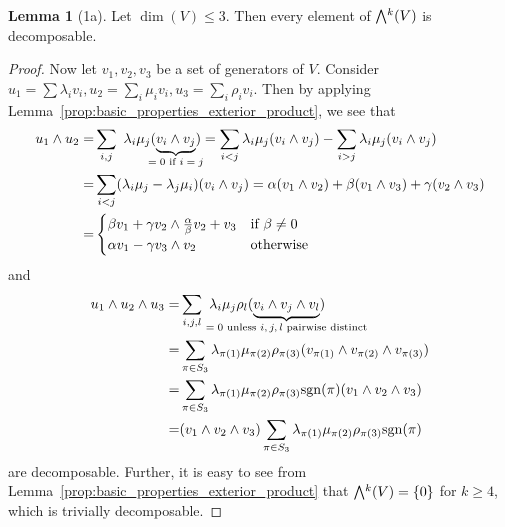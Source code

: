 \documentclass{scrartcl}
\newcommand{\sgn}{\mathrm{sgn}}
\newcommand{\extpow}{\mathchoice{{\textstyle\bigwedge}}
    {{\bigwedge}}
    {{\textstyle\wedge}}
    {{\scriptstyle\wedge}}}
\theoremstyle{definition}
\newtheorem{lemma}[definition]{Lemma}
\begin{document}
\begin{lemma}[1a]
    Let $\dim(V) \leq 3$. Then every element of $\extpow^k(V)$ is decomposable.
\end{lemma}
\begin{proof}
    Now let $v_1, v_2, v_3$ be a set of generators of $V$.
    Consider $u_1 = \sum \lambda_i v_i, u_2 = \sum_i \mu_i v_i, u_3 = \sum_i \rho_i v_i$.
    Then by applying Lemma~\ref{prop:basic_properties_exterior_product}, we see that 
    \begin{align*}
        u_1 \wedge u_2 =& \sum_{i, j} \ \lambda_i \mu_j (\underbrace{v_i \wedge v_j}_{\mathclap{\text{$= 0$ if $i = j$}}}) = \sum_{i < j} \lambda_i \mu_j (v_i \wedge v_j) - \sum_{i > j} \lambda_i \mu_j (v_i \wedge v_j) \\
        =& \sum_{i < j} (\lambda_i \mu_j - \lambda_j \mu_i)(v_i \wedge v_j) = \alpha (v_1 \wedge v_2) + \beta (v_1 \wedge v_3) + \gamma (v_2 \wedge v_3) \\
        =& \begin{cases}
            \beta v_1 + \gamma v_2 \wedge \frac \alpha \beta v_2 + v_3 & \text{if $\beta \neq 0$} \\
            \alpha v_1 - \gamma v_3 \wedge v_2 & \text{otherwise}
        \end{cases}
    \end{align*}
    and
    \begin{align*}
        u_1 \wedge u_2 \wedge u_3 =& \sum_{i, j, l} \ \lambda_i \mu_j \rho_l (\underbrace{v_i \wedge v_j \wedge v_l}_{\mathclap{\text{$= 0$ unless $i, j, l$ pairwise distinct}}}) \\
        =& \sum_{\pi \in S_3} \lambda_{\pi(1)} \mu_{\pi(2)} \rho_{\pi(3)} (v_{\pi(1)} \wedge v_{\pi(2)} \wedge v_{\pi(3)}) \\
        =& \sum_{\pi \in S_3} \lambda_{\pi(1)} \mu_{\pi(2)} \rho_{\pi(3)} \sgn(\pi) (v_1 \wedge v_2 \wedge v_3) \\
        =& (v_1 \wedge v_2 \wedge v_3) \sum_{\pi \in S_3} \lambda_{\pi(1)} \mu_{\pi(2)} \rho_{\pi(3)} \sgn(\pi)
    \end{align*}
    are decomposable.
    Further, it is easy to see from Lemma~\ref{prop:basic_properties_exterior_product} that $\extpow^k(V) = \{ 0 \}$ for $k \geq 4$, which is trivially decomposable.
\end{proof}
\end{document}
